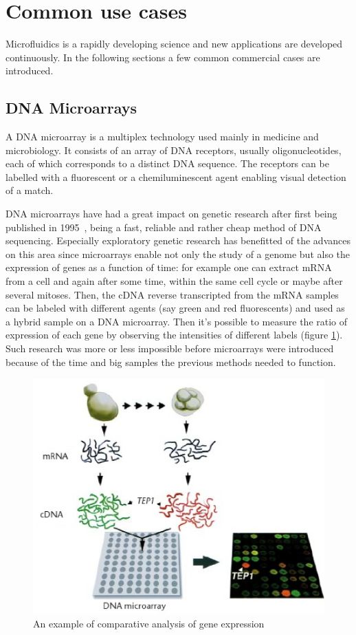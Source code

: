 \documentclass[12pt]{article}
\begin{document}
\section{Common use cases}
Microfluidics is a rapidly developing science and new applications are developed continuously.
In the following sections a few common commercial cases are introduced.

\subsection{DNA Microarrays}
A DNA microarray is a multiplex technology used mainly in medicine and microbiology. It consists
of an array of DNA receptors, usually oligonucleotides, each of which corresponds to a distinct
DNA sequence. The receptors can be labelled with a fluorescent or a chemiluminescent agent enabling
visual detection of a match.

DNA microarrays have had a great impact on genetic research after first being published in 
1995~\cite{SCHENA_1995}, being a fast, reliable and rather cheap method of DNA sequencing.
Especially exploratory genetic research has benefitted of the advances on this area since 
microarrays enable not only the study of a genome but also the expression of genes as a function 
of time: for example one can extract mRNA from a cell and again after some time, within the same cell cycle 
or maybe after several
mitoses. Then, the cDNA reverse transcripted from the mRNA samples can be labeled with 
different agents (say green and red fluorescents) and used as a hybrid sample on a DNA microarray.
Then it's possible to measure the ratio of expression of each gene by observing the intensities of
different labels (figure \ref{fig:expression}). Such research was more or less impossible before
microarrays were introduced because of the time and big samples the previous methods needed to 
function.

\begin{figure}
 \includegraphics[scale=0.75]{gene_expression.eps}
 \caption{An example of comparative analysis of gene expression \cite{BROWN_1999}}
 \label{fig:expression}
\end{figure}
\end{document}
